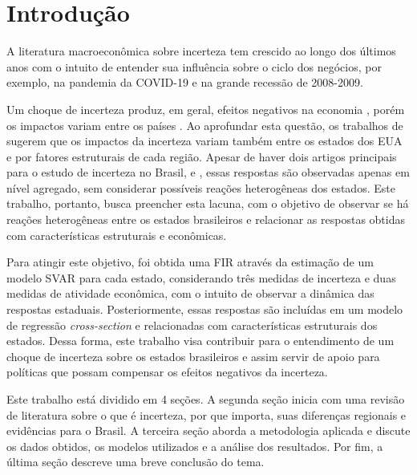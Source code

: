\section{Introdução}

A literatura macroeconômica sobre incerteza tem crescido ao longo dos últimos anos com o intuito de entender sua influência sobre o ciclo dos negócios, por exemplo, na pandemia da COVID-19 \cite{COVID2020economic} e na grande recessão de 2008-2009.
\par

Um choque de incerteza produz, em geral, efeitos negativos na economia \cite{haddow2013macroeconomic, bloom2014fluctuations}, porém os impactos variam entre os países \cite{bloom2017observations}. Ao aprofundar esta questão, os trabalhos de  sugerem que os impactos da incerteza variam também entre os estados dos \gls{EUA} e por fatores estruturais de cada região. Apesar de haver dois artigos principais para o estudo de incerteza no Brasil,  e , essas respostas são observadas apenas em nível agregado, sem considerar possíveis reações heterogêneas dos estados. Este trabalho, portanto, busca preencher esta lacuna, com o objetivo de observar se há reações heterogêneas entre os estados brasileiros e relacionar as respostas obtidas com características estruturais e econômicas.  
\par

Para atingir este objetivo, foi obtida uma \gls{FIR} através da estimação de um modelo \gls{SVAR} para cada estado, considerando três medidas de incerteza e duas medidas de atividade econômica, com o intuito de observar a dinâmica das respostas estaduais. Posteriormente, essas respostas são incluídas em um modelo de regressão \textit{cross-section} e relacionadas com características estruturais dos estados. Dessa forma, este trabalho visa contribuir para o entendimento de um choque de incerteza sobre os estados brasileiros e assim servir de apoio para políticas que possam compensar os efeitos negativos da incerteza.

Este trabalho está dividido em 4 seções. A segunda seção inicia com uma revisão de literatura sobre o que é incerteza, por que importa, suas diferenças regionais e evidências para o Brasil. A terceira seção aborda a metodologia aplicada e discute os dados obtidos, os modelos utilizados e a análise dos resultados. Por fim, a última seção descreve uma breve conclusão do tema.
\par

